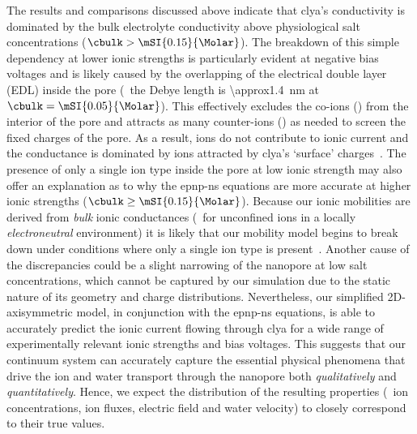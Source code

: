 The results and comparisons discussed above indicate that \gls{clya}'s conductivity is dominated by the bulk
electrolyte conductivity above physiological salt concentrations ($\cbulk > \mSI{0.15}{\Molar}$). The
breakdown of this simple dependency at lower ionic strengths is particularly evident at negative bias voltages
and is likely caused by the overlapping of the electrical double layer (EDL) inside the pore (\ie~the Debye
length is \SI{\approx1.4}{\nm} at $\cbulk=\mSI{0.05}{\Molar}$). This effectively excludes the co-ions (\Cl)
from the interior of the pore and attracts as many counter-ions (\Na) as needed to screen the fixed charges of
the pore. As a result, \Cl{} ions do not contribute to ionic current and the conductance is dominated by \Na{}
ions attracted by \gls{clya}'s `surface' charges~\cite{Uematsu-2018}. The presence of only a single ion type
inside the pore at low ionic strength may also offer an explanation as to why the \gls{epnp-ns} equations are
more accurate at higher ionic strengths ($\cbulk\ge\mSI{0.15}{\Molar}$). Because our ionic mobilities are
derived from \emph{bulk} ionic conductances (\ie~for unconfined ions in a locally \emph{electroneutral}
environment) it is likely that our mobility model begins to break down under conditions where only a single
ion type is present~\cite{Duan-2010}. Another cause of the discrepancies could be a slight narrowing of the
nanopore at low salt concentrations, which cannot be captured by our simulation due to the static nature of
its geometry and charge distributions. Nevertheless, our simplified 2D-axisymmetric model, in conjunction with
the \gls{epnp-ns} equations, is able to accurately predict the ionic current flowing through \gls{clya} for a
wide range of experimentally relevant ionic strengths and bias voltages. This suggests that our continuum
system can accurately capture the essential physical phenomena that drive the ion and water transport through
the nanopore both \emph{qualitatively} and \emph{quantitatively}. Hence, we expect the distribution of the
resulting properties (\eg~ion concentrations, ion fluxes, electric field and water velocity) to closely
correspond to their true values.

